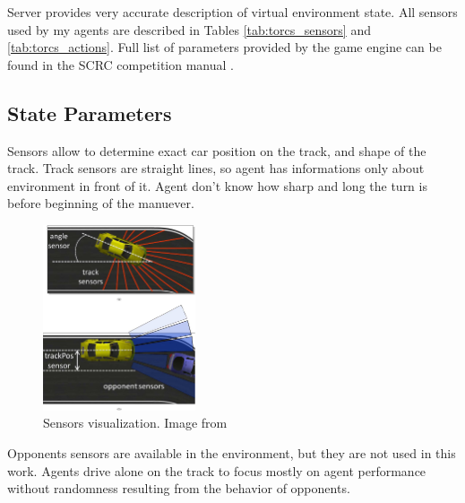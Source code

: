 \documentclass[declaration,shortabstract,english,inz]{iithesis}
\begin{document}
Server provides very accurate description of virtual environment state.
All sensors used by my agents are described in Tables \ref{tab:torcs_sensors} and \ref{tab:torcs_actions}.
Full list of parameters provided by the game engine can be found in the SCRC competition manual \cite{scrc_manual}.

\subsection{State Parameters}

Sensors allow to determine exact car position on the track, and shape of the track.
Track sensors are straight lines, so agent has informations only about environment in front of it. Agent don't know how sharp and long the turn is before beginning of the  manuever.

\begin{figure}[h]
    \centering
    \includegraphics[width=0.4\textwidth]{img/sensors.png}
    \caption{Sensors visualization. Image from \cite{SCRC}}
    \label{fig:sensors_img}
\end{figure}


Opponents sensors are available in the environment, but they are not used in this work. Agents drive alone on the track to focus mostly on agent performance without randomness resulting from the behavior of opponents.
\end{document}
